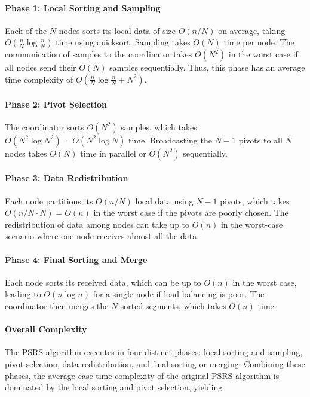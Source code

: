 \documentclass[]{interact}
\theoremstyle{plain}
\theoremstyle{definition}
\theoremstyle{remark}
\begin{document}
\paragraph{Phase 1: Local Sorting and Sampling} 
Each of the $N$ nodes sorts its local data of size $O(n/N)$ on average, taking $O\left(\frac{n}{N} \log \frac{n}{N}\right)$ time using quicksort. Sampling takes $O(N)$ time per node. The communication of samples to the coordinator takes $O(N^2)$ in the worst case if all nodes send their $O(N)$ samples sequentially. Thus, this phase has an average time complexity of $O\left(\frac{n}{N} \log \frac{n}{N} + N^2\right)$.

\paragraph{Phase 2: Pivot Selection}
The coordinator sorts $O(N^2)$ samples, which takes $O(N^2 \log N^2) = O(N^2 \log N)$ time. Broadcasting the $N - 1$ pivots to all $N$ nodes takes $O(N)$ time in parallel or $O(N^2)$ sequentially.

\paragraph{Phase 3: Data Redistribution} Each node partitions its $O(n/N)$ local data using $N - 1$ pivots, which takes $O(n/N \cdot N) = O(n)$ in the worst case if the pivots are poorly chosen. The redistribution of data among nodes can take up to $O(n)$ in the worst-case scenario where one node receives almost all the data.

\paragraph{Phase 4: Final Sorting and Merge} Each node sorts its received data, which can be up to $O(n)$ in the worst case, leading to $O(n \log n)$ for a single node if load balancing is poor. The coordinator then merges the $N$ sorted segments, which takes $O(n)$ time.

\paragraph{Overall Complexity} 
The PSRS algorithm executes in four distinct phases: local sorting and sampling, pivot selection, data redistribution, and final sorting or merging. Combining these phases, the average-case time complexity of the original PSRS algorithm is dominated by the local sorting and pivot selection, yielding
\end{document}
